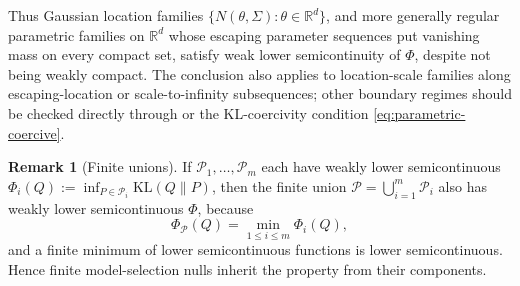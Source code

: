 \documentclass[11pt]{article}
\newcommand{\KL}{\mathrm{KL}}
\newcommand{\RR}{\mathbb{R}}
\newcommand{\Pcal}{\mathcal{P}}
\theoremstyle{definition}
\newtheorem{remark}[theorem]{Remark}
\theoremstyle{definition}
\begin{document}
Thus Gaussian location families \(\{N(\theta,\Sigma):\theta\in\RR^d\}\), and more generally regular parametric families on \(\RR^d\) whose escaping parameter sequences put vanishing mass on every compact set, satisfy weak lower semicontinuity of \(\Phi\), despite not being weakly compact.  The conclusion also applies to location-scale families along escaping-location or scale-to-infinity subsequences; other boundary regimes should be checked directly through  or the KL-coercivity condition \eqref{eq:parametric-coercive}.


\begin{remark}[Finite unions]
If \(\Pcal_1,\ldots,\Pcal_m\) each have weakly lower semicontinuous \(\Phi_i(Q):=\inf_{P\in\Pcal_i}\KL(Q\|P)\), then the finite union \(\Pcal=\bigcup_{i=1}^m\Pcal_i\) also has weakly lower semicontinuous \(\Phi\), because
\[
  \Phi_\Pcal(Q)=\min_{1\le i\le m}\Phi_i(Q),
\]
and a finite minimum of lower semicontinuous functions is lower semicontinuous.  Hence finite model-selection nulls inherit the property from their components.
\end{remark}
\end{document}
